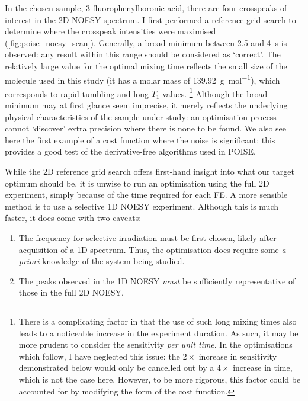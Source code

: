 In the chosen sample, 3-fluorophenylboronic acid, there are four crosspeaks of interest in the 2D NOESY spectrum.
I first performed a reference grid search to determine where the crosspeak intensities were maximised (\cref{fig:poise_noesy_scan}).
Generally, a broad minimum between 2.5 and \qty{4}{\s} is observed: any result within this range should be considered as `correct'.%
The relatively large value for the optimal mixing time reflects the small size of the molecule used in this study (it has a molar mass of \qty{139.92}{\g\per\mol}), which corresponds to rapid tumbling and long $T_1$ values.
\footnote{There is a complicating factor in that the use of such long mixing times also leads to a noticeable increase in the experiment duration.
As such, it may be more prudent to consider the sensitivity \textit{per unit time}.
In the optimisations which follow, I have neglected this issue: the $2\times$ increase in sensitivity demonstrated below would only be cancelled out by a $4\times$ increase in time, which is not the case here.
However, to be more rigorous, this factor could be accounted for by modifying the form of the cost function.}
Although the broad minimum may at first glance seem imprecise, it merely reflects the underlying physical characteristics of the sample under study: an optimisation process cannot `discover' extra precision where there is none to be found.
We also see here the first example of a cost function where the noise is significant: this provides a good test of the derivative-free algorithms used in POISE.

While the 2D reference grid search offers first-hand insight into what our target optimum should be, it is unwise to run an optimisation using the full 2D experiment, simply because of the time required for each FE.
A more sensible method is to use a selective 1D NOESY experiment.
Although this is much faster, it does come with two caveats:
\begin{enumerate}
    \item The frequency for selective irradiation must be first chosen, likely after acquisition of a 1D \proton{} spectrum.
        Thus, the optimisation does require some \textit{a priori} knowledge of the system being studied.
    \item The peaks observed in the 1D NOESY \textit{must} be sufficiently representative of those in the full 2D NOESY.
\end{enumerate}

